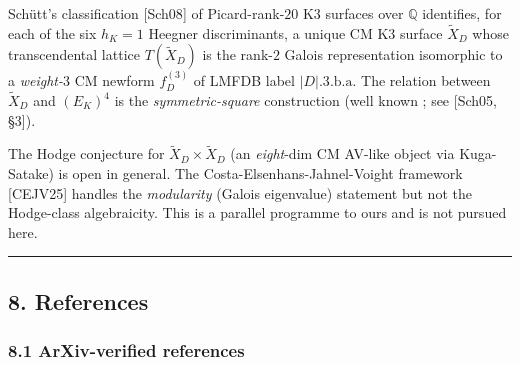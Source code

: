 \documentclass[
  11pt,
  a4paper,
]{amsart}
\begin{document}
Schütt's classification {[}Sch08{]} of Picard-rank-\(20\) K3 surfaces over \(\mathbb{Q}\) identifies, for each of the six \(h_K = 1\) Heegner discriminants, a unique CM K3 surface \(\widetilde X_D\) whose transcendental lattice \(T(\widetilde X_D)\) is the rank-\(2\) Galois representation isomorphic to a \emph{weight-\(3\)} CM newform \(f_D^{(3)}\) of LMFDB label \(|D|.3.\mathrm{b}.\mathrm{a}\). The relation between \(\widetilde X_D\) and \((E_K)^4\) is the \emph{symmetric-square} construction (well known ; see {[}Sch05, §3{]}).

The Hodge conjecture for \(\widetilde X_D \times \widetilde X_D\) (an \emph{eight}-dim CM AV-like object via Kuga-Satake) is open in general. The Costa-Elsenhans-Jahnel-Voight framework {[}CEJV25{]} handles the \emph{modularity} (Galois eigenvalue) statement but not the Hodge-class algebraicity. This is a parallel programme to ours and is not pursued here.

\begin{center}\rule{0.5\linewidth}{0.5pt}\end{center}

\hypertarget{references}{%
\subsection{8. References}\label{references}}

\hypertarget{arxiv-verified-references}{%
\subsubsection{8.1 ArXiv-verified references}\label{arxiv-verified-references}}
\end{document}
